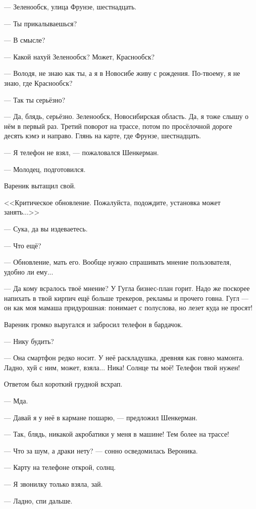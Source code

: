 --- Зеленообск, улица Фрунзе, шестнадцать.

--- Ты прикалываешься?

--- В смысле?

--- Какой нахуй Зеленообск?
Может, Краснообск?

--- Володя, не знаю как ты, а я в Новосибе живу с рождения.
По-твоему, я не знаю, где Краснообск?

--- Так ты серьёзно?

--- Да, блядь, серьёзно.
Зеленообск, Новосибирская область.
Да, я тоже слышу о нём в первый раз.
Третий поворот на трассе, потом по просёлочной дороге десять кэмэ и направо.
Глянь на карте, где Фрунзе, шестнадцать.

--- Я телефон не взял, --- пожаловался Шенкерман.

--- Молодец, подготовился.

Вареник вытащил свой.

<<Критическое обновление.
Пожалуйста, подождите, установка может занять...>>

--- Сука, да вы издеваетесь.

--- Что ещё?

--- Обновление, мать его.
Вообще нужно спрашивать мнение пользователя, удобно ли ему...

--- Да кому всралось твоё мнение?
У Гугла бизнес-план горит.
Надо же поскорее напихать в твой кирпич ещё больше трекеров, рекламы и прочего говна.
Гугл --- он как моя мамаша придурошная: понимает с полуслова, но лезет куда не просят!

Вареник громко выругался и забросил телефон в бардачок.

--- Нику будить?

--- Она смартфон редко носит.
У неё раскладушка, древняя как говно мамонта.
Ладно, хуй с ним, может, взяла...
Ника!
Солнце ты моё!
Телефон твой нужен!

Ответом был короткий грудной всхрап.

--- Мда.

--- Давай я у неё в кармане пошарю, --- предложил Шенкерман.

--- Так, блядь, никакой акробатики у меня в машине!
Тем более на трассе!

--- Что за шум, а драки нету? --- сонно осведомилась Вероника.

--- Карту на телефоне открой, солнц.

--- Я звонилку только взяла, зай.

--- Ладно, спи дальше.

